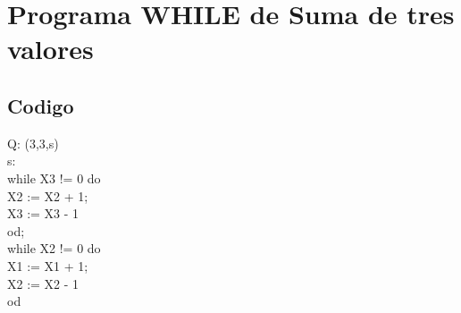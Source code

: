 \documentclass[a4paper]{article}
\theoremstyle{definition}
\begin{document}
\section{Programa WHILE de Suma de tres valores}
\subsection{Codigo}
Q: (3,3,s)\\
s:\\
while X3 != 0 do\\
X2 := X2 + 1;\\
X3 := X3 - 1\\
od;\\
while X2 != 0 do\\
X1 := X1 + 1;\\
X2 := X2 - 1\\
od
\end{document}
